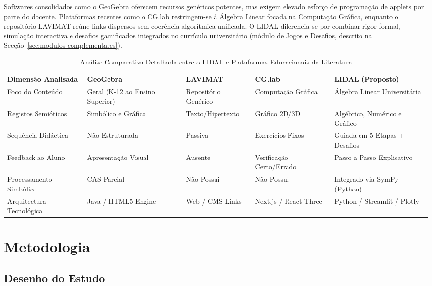 \documentclass[conference]{IEEEtran}
\begin{document}
Softwares consolidados como o GeoGebra \cite{hohenwarter2004} oferecem recursos genéricos potentes, mas exigem elevado esforço de programação de applets por parte do docente. Plataformas recentes como o CG.lab \cite{damiano2025} restringem-se à Álgebra Linear focada na Computação Gráfica, enquanto o repositório LAVIMAT \cite{araujo2024} reúne links dispersos sem coerência algorítmica unificada. O LIDAL diferencia-se por combinar rigor formal, simulação interactiva e desafios gamificados integrados no currículo universitário (módulo de Jogos e Desafios, descrito na Secção~\ref{sec:modulos-complementares}).

\begin{table}[htbp]
\caption{Análise Comparativa Detalhada entre o LIDAL e Plataformas Educacionais da Literatura}
\label{tab:comparativa}
\centering
\begin{tabular}{|l|l|l|l|l|}
\hline
\textbf{Dimensão Analisada} & \textbf{GeoGebra \cite{hohenwarter2004}} & \textbf{LAVIMAT \cite{araujo2024}} & \textbf{CG.lab \cite{damiano2025}} & \textbf{LIDAL (Proposto)} \\
\hline
Foco do Conteúdo & Geral (K-12 ao Ensino Superior) & Repositório Genérico & Computação Gráfica & Álgebra Linear Universitária \\
\hline
Registos Semióticos & Simbólico e Gráfico & Texto/Hipertexto & Gráfico 2D/3D & Algébrico, Numérico e Gráfico \\
\hline
Sequência Didáctica & Não Estruturada & Passiva & Exercícios Fixos & Guiada em 5 Etapas + Desafios \\
\hline
Feedback ao Aluno & Apresentação Visual & Ausente & Verificação Certo/Errado & Passo a Passo Explicativo \\
\hline
Processamento Simbólico & CAS Parcial & Não Possui & Não Possui & Integrado via SymPy (Python) \\
\hline
Arquitectura Tecnológica & Java / HTML5 Engine & Web / CMS Links & Next.js / React Three & Python / Streamlit / Plotly \\
\hline
\end{tabular}
\end{table}

\section{Metodologia}

\subsection{Desenho do Estudo}
\end{document}
